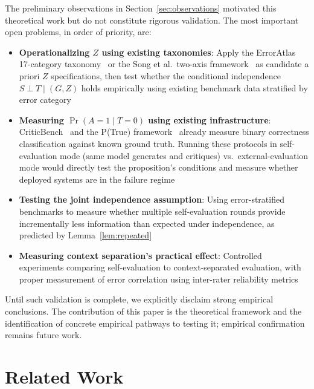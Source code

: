 \documentclass[11pt]{article}
\begin{document}
The preliminary observations in Section~\ref{sec:observations} motivated this theoretical
work but do not constitute rigorous validation. The most important open problems, in order
of priority, are:
\begin{itemize}
    \item \textbf{Operationalizing $Z$ using existing taxonomies}: Apply the ErrorAtlas
    17-category taxonomy~\citep{erroratlas2026} or the Song et al.\ two-axis
    framework~\citep{song2026reasoning} as candidate a priori $Z$ specifications, then
    test whether the conditional independence $S \perp T \mid (G, Z)$ holds empirically
    using existing benchmark data stratified by error category
    \item \textbf{Measuring $\Pr(A=1 \mid T=0)$ using existing infrastructure}:
    CriticBench~\citep{lin2024criticbench} and the P(True) framework~\citep{kadavath2022ptrue}
    already measure binary correctness classification against known ground truth. Running
    these protocols in self-evaluation mode (same model generates and critiques) vs.\
    external-evaluation mode would directly test the proposition's conditions and measure
    whether deployed systems are in the failure regime
    \item \textbf{Testing the joint independence assumption}: Using error-stratified
    benchmarks to measure whether multiple self-evaluation rounds provide incrementally
    less information than expected under independence, as predicted by
    Lemma~\ref{lem:repeated}
    \item \textbf{Measuring context separation's practical effect}: Controlled experiments
    comparing self-evaluation to context-separated evaluation, with proper measurement of
    error correlation using inter-rater reliability metrics
\end{itemize}
Until such validation is complete, we explicitly disclaim strong empirical conclusions.
The contribution of this paper is the theoretical framework and the identification of
concrete empirical pathways to testing it; empirical confirmation remains future work.

\section{Related Work}
\end{document}
